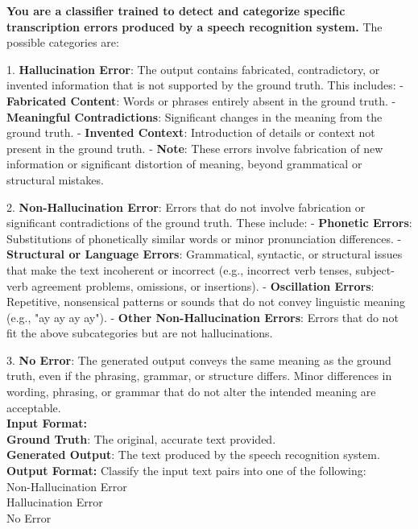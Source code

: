 \begin{figure*}[h]
    \centering
    \begin{tcolorbox}
    \small
    \textbf{You are a classifier trained to detect and categorize specific transcription errors produced by a speech recognition system.} The possible categories are:

    1. \textbf{Hallucination Error}: The output contains fabricated, contradictory, or invented information that is not supported by the ground truth. This includes:
       - \textbf{Fabricated Content}: Words or phrases entirely absent in the ground truth.
       - \textbf{Meaningful Contradictions}: Significant changes in the meaning from the ground truth.
       - \textbf{Invented Context}: Introduction of details or context not present in the ground truth.  
       - \textbf{Note}: These errors involve fabrication of new information or significant distortion of meaning, beyond grammatical or structural mistakes.

    2. \textbf{Non-Hallucination Error}: Errors that do not involve fabrication or significant contradictions of the ground truth. These include:
       - \textbf{Phonetic Errors}: Substitutions of phonetically similar words or minor pronunciation differences.
       - \textbf{Structural or Language Errors}: Grammatical, syntactic, or structural issues that make the text incoherent or incorrect (e.g., incorrect verb tenses, subject-verb agreement problems, omissions, or insertions).
       - \textbf{Oscillation Errors}: Repetitive, nonsensical patterns or sounds that do not convey linguistic meaning (e.g., "ay ay ay ay").
       - \textbf{Other Non-Hallucination Errors}: Errors that do not fit the above subcategories but are not hallucinations.

    3. \textbf{No Error}: The generated output conveys the same meaning as the ground truth, even if the phrasing, grammar, or structure differs. Minor differences in wording, phrasing, or grammar that do not alter the intended meaning are acceptable. \\

    \textbf{Input Format:} \\
    \textbf{Ground Truth}: The original, accurate text provided. \\
    \textbf{Generated Output}: The text produced by the speech recognition system. \\

    \textbf{Output Format:}
    Classify the input text pairs into one of the following: \\
    Non-Hallucination Error \\
    Hallucination Error \\
    No Error \\


\end{tcolorbox}
\end{figure*}
